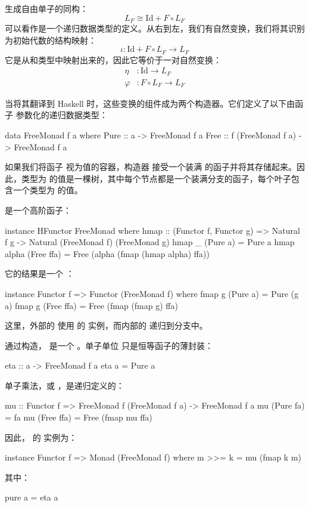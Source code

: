 \documentclass[DaoFP]{subfiles}
\begin{document}
生成自由单子的同构：
\[ L_F \cong \text{Id} + F \circ L_F \]
可以看作是一个递归数据类型的定义。从右到左，我们有自然变换，我们将其识别为初始代数的结构映射：
\[\iota \colon \text{Id} + F \circ L_F \to L_F\]
它是从和类型中映射出来的，因此它等价于一对自然变换：
\begin{align*}
\eta &\colon \text{Id} \to L_F
\\
\varphi &\colon F \circ L_F \to L_F
\end{align*}

当将其翻译到 Haskell 时，这些变换的组件成为两个构造器。它们定义了以下由函子  参数化的递归数据类型：
\begin{haskell}
data FreeMonad f a where
   Pure :: a -> FreeMonad f a
   Free :: f (FreeMonad f a) -> FreeMonad f a
\end{haskell}

如果我们将函子  视为值的容器，构造器  接受一个装满  的函子并将其存储起来。因此，类型为  的值是一棵树，其中每个节点都是一个装满分支的函子，每个叶子包含一个类型为  的值。

 是一个高阶函子：
\begin{haskell}
instance HFunctor FreeMonad where
   hmap :: (Functor f, Functor g) =>
      Natural f g -> Natural (FreeMonad f) (FreeMonad g)
   hmap _ (Pure a) = Pure a
   hmap alpha (Free ffa) = Free (alpha (fmap (hmap alpha) ffa))
\end{haskell}

它的结果是一个 ：
\begin{haskell}
instance Functor f => Functor (FreeMonad f) where
  fmap g (Pure a) = Pure (g a)
  fmap g (Free ffa) = Free (fmap (fmap g) ffa)
\end{haskell}
这里，外部的  使用  的  实例，而内部的  递归到分支中。

通过构造， 是一个 。单子单位  只是恒等函子的薄封装：
\begin{haskell}
eta :: a -> FreeMonad f a
eta a = Pure a
\end{haskell}

单子乘法，或 ，是递归定义的：
\begin{haskell}
mu :: Functor f => FreeMonad f (FreeMonad f a) -> FreeMonad f a
mu (Pure fa) = fa
mu (Free ffa) = Free (fmap mu ffa)
\end{haskell}

因此， 的  实例为：
\begin{haskell}
instance Functor f => Monad (FreeMonad f) where
  m >>= k = mu (fmap k m)
\end{haskell}
其中：
\begin{haskell}
  pure a = eta a
\end{haskell}
\end{document}
